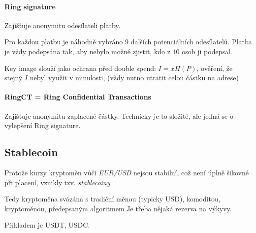 \documentclass[10pt,a4paper]{article}
\begin{document}
\paragraph{Ring signature}
Zajišťuje anonymitu odesílateli platby.

Pro každou platbu je náhodně vybráno $ 9 $ dalších potenciálních odesílatelů.
Platba je vždy podepsána tak, aby nebylo možné zjistit, kdo z $ 10 $ osob ji podepsal.

Key image slouží jako ochrana před double spend: $ I = x H(P) $, ověření, že stejný $ I $ nebyl využit v minulosti, (vždy nutno utratit celou částku na adrese)

\paragraph{RingCT = Ring Confidential Transactions}
Zajišťuje anonymitu zaplacené částky. Technicky je to složité, ale jedná se o vylepšení Ring signature.

\subsection{Stablecoin}

Protože kurzy kryptoměn vůči \textit{EUR/USD} nejsou stabilní, což není úplně šikovné při placení, vznikly tzv. \textit{stablecoiny}.

Tedy kryptoměna svázána s tradiční měnou (typicky USD), komoditou, kryptoměnou, předepsaným algoritmem
Je třeba nějaká rezerva na výkyvy.

Příkladem je USDT, USDC.
\end{document}
